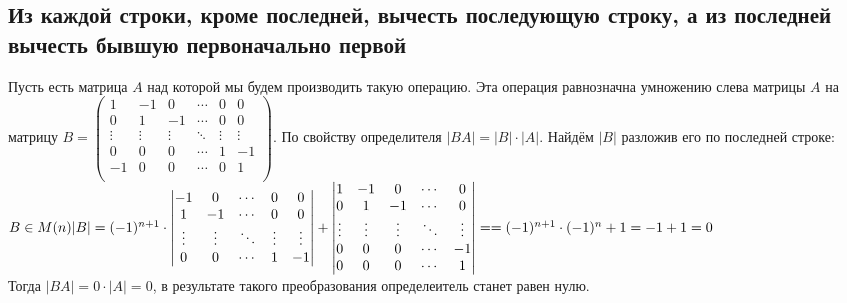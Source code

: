\subsection{Из каждой строки, кроме последней, вычесть последующую строку, а из последней вычесть бывшую первоначально первой}
Пусть есть матрица $ A $ над которой мы будем производить такую операцию.
Эта операция равнозначна умножению слева матрицы $ A $ на матрицу
$
	B =
	\begin{pmatrix}
		1      & -1     & 0      & \cdots & 0      & 0      \\
		0      & 1      & -1     & \cdots & 0      & 0      \\
		\vdots & \vdots & \vdots & \ddots & \vdots & \vdots \\
		0      & 0      & 0      & \cdots & 1      & -1     \\
		-1     & 0      & 0      & \cdots & 0      & 1      \\
	\end{pmatrix}
$. По свойству определителя $ |BA| = |B| \cdot |A| $. Найдём $ |B| $ разложив его по последней строке:
\\[1em]
$
	B \in M(n)
	\\[1em]
	|B| = (-1)^{n+1} \cdot
	\begin{vmatrix}
		-1     & 0      & \cdots & 0      & 0      \\
		1      & -1     & \cdots & 0      & 0      \\
		\vdots & \vdots & \ddots & \vdots & \vdots \\
		0      & 0      & \cdots & 1      & -1     \\
	\end{vmatrix}
	+
	\begin{vmatrix}
		1      & -1     & 0      & \cdots & 0      \\
		0      & 1      & -1     & \cdots & 0      \\
		\vdots & \vdots & \vdots & \ddots & \vdots \\
		0      & 0      & 0      & \cdots & -1     \\
		0      & 0      & 0      & \cdots & 1      \\
	\end{vmatrix}
	=
	\\[1em]
	=
	(-1)^{n+1} \cdot (-1)^n + 1 = -1 + 1 = 0
$
\\[1em]
Тогда $ |BA| = 0 \cdot |A| = 0 $, в результате такого преобразования определеитель станет равен нулю.
